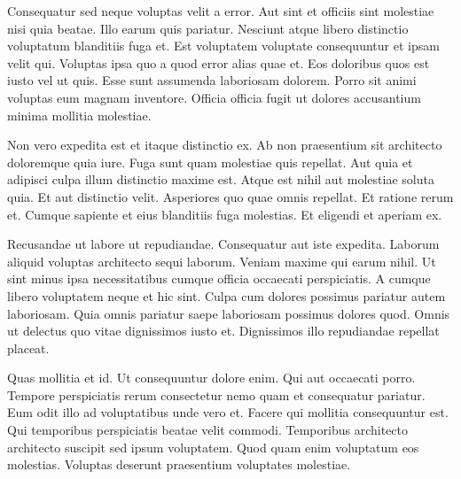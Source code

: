 Consequatur sed neque voluptas velit a error. Aut sint et officiis sint molestiae nisi quia beatae. Illo earum quis pariatur. Nesciunt atque libero distinctio voluptatum blanditiis fuga et. Est voluptatem voluptate consequuntur et ipsam velit qui. Voluptas ipsa quo a quod error alias quae et. Eos doloribus quos est iusto vel ut quis. Esse sunt assumenda laboriosam dolorem. Porro sit animi voluptas eum magnam inventore. Officia officia fugit ut dolores accusantium minima mollitia molestiae.

Non vero expedita est et itaque distinctio ex. Ab non praesentium sit architecto doloremque quia iure. Fuga sunt quam molestiae quis repellat. Aut quia et adipisci culpa illum distinctio maxime est. Atque est nihil aut molestiae soluta quia. Et aut distinctio velit. Asperiores quo quae omnis repellat. Et ratione rerum et. Cumque sapiente et eius blanditiis fuga molestias. Et eligendi et aperiam ex.

Recusandae ut labore ut repudiandae. Consequatur aut iste expedita. Laborum aliquid voluptas architecto sequi laborum. Veniam maxime qui earum nihil. Ut sint minus ipsa necessitatibus cumque officia occaecati perspiciatis. A cumque libero voluptatem neque et hic sint. Culpa cum dolores possimus pariatur autem laboriosam. Quia omnis pariatur saepe laboriosam possimus dolores quod. Omnis ut delectus quo vitae dignissimos iusto et. Dignissimos illo repudiandae repellat placeat.

Quas mollitia et id. Ut consequuntur dolore enim. Qui aut occaecati porro. Tempore perspiciatis rerum consectetur nemo quam et consequatur pariatur. Eum odit illo ad voluptatibus unde vero et. Facere qui mollitia consequuntur est. Qui temporibus perspiciatis beatae velit commodi. Temporibus architecto architecto suscipit sed ipsum voluptatem. Quod quam enim voluptatum eos molestias. Voluptas deserunt praesentium voluptates molestiae.

